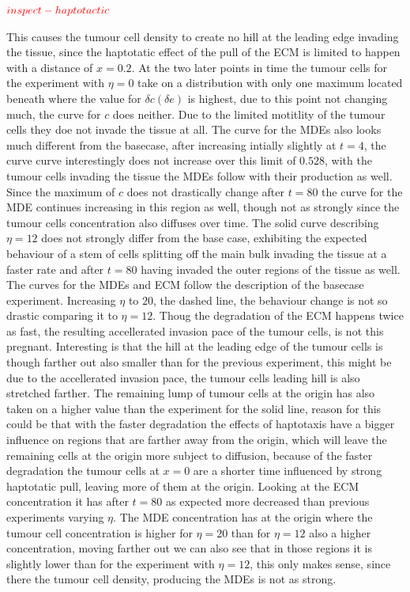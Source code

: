$\textcolor{red}{inspect-haptotactic}$

This causes the tumour cell density to create no hill at the leading edge invading the tissue, since the haptotatic effect of the pull of the ECM is limited to happen with a distance of $x=0.2$. At the two later points in time the tumour cells for the experiment with $\eta=0$ take on a distribution with only one maximum located beneath where the value for $\delta c (\delta e)$ is highest, due to this point not changing much, the curve for $c$ does neither. Due to the limited motitlity of the tumour cells they doe not invade the tissue at all. The curve for the MDEs also looks much different from the basecase, after increasing intially slightly at $t=4$, the curve curve interestingly does not increase over this limit of $0.528$, with the tumour cells invading the tissue the MDEs follow with their production as well. Since the maximum of $c$ does not drastically change after $t=80$ the curve for the MDE continues increasing in this region as well, though not as strongly since the tumour cells concentration also diffuses over time. 
The solid curve describing $\eta=12$ does not strongly differ from the base case, exhibiting the expected behaviour of a stem of cells splitting off the main bulk invading the tissue at a faster rate and after $t=80$ having invaded the outer regions of the tissue as well. The curves for the MDEs and ECM follow the description of the basecase experiment. 
Increasing $\eta$ to $20$, the dashed line, the behaviour change is not so drastic comparing it to $\eta=12$. Thoug the degradation of the ECM happens twice as fast, the resulting accellerated invasion pace of the tumour cells, is not this pregnant. Interesting is that the hill at the leading edge of the tumour cells is though farther out also smaller than for the previous experiment, this might be due to the accellerated invasion pace, the tumour cells leading hill is also stretched farther. The remaining lump of tumour cells at the origin has also taken on a higher value than the experiment for the solid line, reason for this could be that with the faster degradation the effects of haptotaxis have a bigger influence on regions that are farther away from the origin, which will leave the remaining cells at the origin more subject to diffusion, because of the faster degradation the tumour cells at $x=0$ are a shorter time influenced by strong haptotatic pull, leaving more of them at the origin. Looking at the ECM concentration it has after $t=80$ as expected more decreased than previous experiments varying $\eta$. The MDE concentration has at the origin where the tumour cell concentration is higher for $\eta=20$ than for $\eta=12$ also a higher concentration, moving farther out we can also see that in those regions it is slightly lower than for the experiment with $\eta=12$, this only makes sense, since there the tumour cell density, producing the MDEs is not as strong. 
